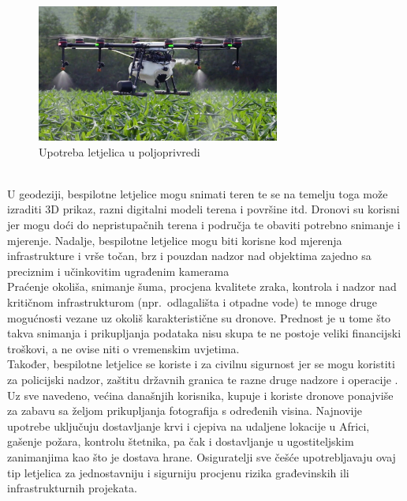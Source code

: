 \documentclass[times, utf8, diplomski]{fer}
\begin{document}
\begin{figure}[htb]
\centering
\includegraphics[width=8cm]{img/poljoprivreda.png}
\caption{Upotreba letjelica u poljoprivredi\protect\footnotemark}
\label{fig:letjelicaUPoljoprivredi}
\end{figure}
\\
U geodeziji, bespilotne letjelice mogu snimati teren te se na temelju toga može izraditi 3D prikaz, razni digitalni modeli terena i površine itd. Dronovi su korisni jer mogu doći do nepristupačnih terena i područja te obaviti potrebno snimanje  i mjerenje.  Nadalje,  bespilotne letjelice  mogu  biti korisne kod mjerenja infrastrukture i vrše točan, brz i pouzdan nadzor nad objektima zajedno sa preciznim i učinkovitim ugrađenim kamerama \citep{GeoTron}\\
Praćenje  okoliša,  snimanje  šuma,  procjena  kvalitete  zraka,  kontrola   i nadzor nad kritičnom infrastrukturom (npr.~odlagališta  i otpadne  vode)  te  mnoge  druge  mogućnosti  vezane  uz  okoliš  karakteristične  su  dronove. Prednost je u tome što takva snimanja i prikupljanja podataka nisu skupa te ne postoje veliki financijski troškovi, a ne ovise niti o vremenskim uvjetima.\\
Također, bespilotne letjelice se koriste i za civilnu sigurnost jer se mogu koristiti za policijski nadzor, zaštitu državnih granica te razne druge nadzore i operacije \citep{GeoTron}. Uz sve navedeno, većina današnjih korisnika, kupuje i koriste dronove ponajviše za zabavu sa željom prikupljanja fotografija s određenih visina. 
Najnovije upotrebe uključuju dostavljanje krvi i cjepiva na udaljene lokacije u Africi, gašenje požara, kontrolu štetnika, pa čak i dostavljanje u ugostiteljskim zanimanjima kao što je dostava hrane.
Osiguratelji  sve  češće  upotrebljavaju ovaj  tip  letjelica za  jednostavniju  i  sigurniju procjenu rizika građevinskih ili infrastrukturnih projekata.
\end{document}
